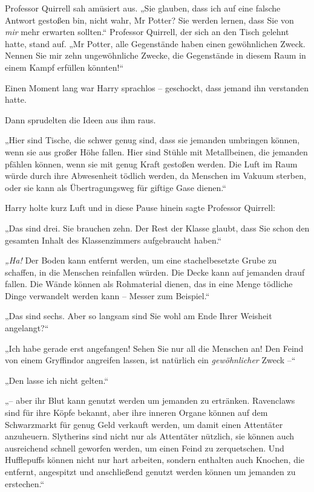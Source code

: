 {Professor Quirrell sah amüsiert aus. „Sie glauben, dass ich auf eine falsche Antwort gestoßen bin, nicht wahr, Mr Potter? Sie werden lernen, dass Sie von \emph{mir} mehr erwarten sollten.“ Professor Quirrell, der sich an den Tisch gelehnt hatte, stand auf. „Mr Potter, alle Gegenstände haben einen gewöhnlichen Zweck. Nennen Sie mir zehn ungewöhnliche Zwecke, die Gegenstände in diesem Raum in einem Kampf erfüllen könnten!“

Einen Moment lang war Harry sprachlos -- geschockt, dass jemand ihn verstanden hatte.

Dann sprudelten die Ideen aus ihm raus.

„Hier sind Tische, die schwer genug sind, dass sie jemanden umbringen können, wenn sie aus großer Höhe fallen. Hier sind Stühle mit Metallbeinen, die jemanden pfählen können, wenn sie mit genug Kraft gestoßen werden. Die Luft im Raum würde durch ihre Abwesenheit tödlich werden, da Menschen im Vakuum sterben, oder sie kann als Übertragungsweg für giftige Gase dienen.“

Harry holte kurz Luft und in diese Pause hinein sagte Professor Quirrell:

„Das sind drei. Sie brauchen zehn. Der Rest der Klasse glaubt, dass Sie schon den gesamten Inhalt des Klassenzimmers aufgebraucht haben.“

\emph{„Ha!} Der Boden kann entfernt werden, um eine stachelbesetzte Grube zu schaffen, in die Menschen reinfallen würden. Die Decke kann auf jemanden drauf fallen. Die Wände können als Rohmaterial dienen, das in eine Menge tödliche Dinge verwandelt werden kann -- Messer zum Beispiel.“

„Das sind sechs. Aber so langsam sind Sie wohl am Ende Ihrer Weisheit angelangt?“

„Ich habe gerade erst angefangen! Sehen Sie nur all die Menschen an! Den Feind von einem Gryffindor angreifen lassen, ist natürlich ein \emph{gewöhnlicher} Zweck --“

„Den lasse ich nicht gelten.“

„-- aber ihr Blut kann genutzt werden um jemanden zu ertränken. Ravenclaws sind für ihre Köpfe bekannt, aber ihre inneren Organe können auf dem Schwarzmarkt für genug Geld verkauft werden, um damit einen Attentäter anzuheuern. Slytherins sind nicht nur als Attentäter nützlich, sie können auch ausreichend schnell geworfen werden, um einen Feind zu zerquetschen. Und Hufflepuffs können nicht nur hart arbeiten, sondern enthalten auch Knochen, die entfernt, angespitzt und anschließend genutzt werden können um jemanden zu erstechen.“

}
